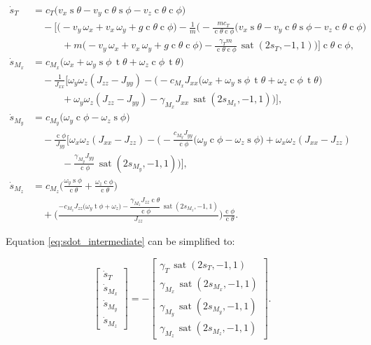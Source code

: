 \documentclass[conf]{new-aiaa}
\DeclareMathOperator{\s}{s}
\DeclareMathOperator{\cs}{c}
\DeclareMathOperator{\tn}{t}
\DeclareMathOperator{\sat}{sat}
\begin{document}
\small
\begingroup
\setlength{\jot}{1pt}
\begin{equation}
\label{eq:sdot_intermediate}
\begin{aligned}
\dot s_T
&= c_T\!\bigl(
v_x \s\theta - v_y \cs\theta \s\phi - v_z \cs\theta \cs\phi
\bigr) \\
&\quad - \biggl[
\bigl(
-v_y \,\omega_x + v_x \,\omega_y + g \cs\theta \cs\phi
\bigr)
- \frac{1}{m} \biggl(
-\frac{m c_T}{\cs\theta \cs\phi} \bigl(
v_x \s\theta - v_y \cs\theta \s\phi - v_z \cs\theta \cs\phi
\bigr) \\
&\qquad\quad
+ m \bigl(
-v_y \,\omega_x + v_x \,\omega_y + g \cs\theta \cs\phi
\bigr)
- \frac{\gamma_T m}{\cs\theta \cs\phi}\,
\sat(2s_T,-1,1)
\biggr) \biggr] \cs\theta \cs\phi,
\\[0.35em]
\dot s_{M_x}
&= c_{M_x} \!\bigl(
\omega_x + \omega_y \s\phi \,\tn\theta + \omega_z \cs\phi \,\tn\theta
\bigr) \\
&\quad - \frac{1}{J_{xx}} \biggl[
\omega_y \omega_z (J_{zz} - J_{yy})
- \bigl(
-c_{M_x} J_{xx} \bigl(
\omega_x + \omega_y \s\phi \,\tn\theta + \omega_z \cs\phi \,\tn\theta
\bigr) \\
&\qquad\quad
 + \omega_y \omega_z (J_{zz} - J_{yy})
 - \gamma_{M_x} J_{xx}\, \sat(2s_{M_x},-1,1)
\bigr) \biggr],
\\[0.35em]
\dot s_{M_y}
&= c_{M_y} \!\bigl(
\omega_y \cs\phi - \omega_z \s\phi
\bigr) \\
&\quad - \frac{\cs\phi}{J_{yy}} \biggl[
\omega_x \omega_z (J_{xx} - J_{zz})
- \biggl(
-\frac{c_{M_y} J_{yy}}{\cs\phi} \bigl(
\omega_y \cs\phi - \omega_z \s\phi
\bigr)
 + \omega_x \omega_z (J_{xx} - J_{zz}) \\
&\qquad\quad
 - \frac{\gamma_{M_y} J_{yy}}{\cs\phi}\,
\sat(2s_{M_y},-1,1)
\biggr) \biggr],
\\[0.35em]
\dot s_{M_z}
&= c_{M_z} \!\biggl(
\frac{\omega_y \s\phi}{\cs\theta} + \frac{\omega_z \cs\phi}{\cs\theta}
\biggr) \\
&\quad + \biggl(
\frac{
-c_{M_z} J_{zz} \bigl( \omega_y \tn\phi + \omega_z \bigr)
 - \dfrac{\gamma_{M_z} J_{zz} \cs\theta}{\cs\phi}\,
\sat(2s_{M_z},-1,1)
}{J_{zz}}
\biggr) \frac{\cs\phi}{\cs\theta}.
\end{aligned}
\end{equation}
\endgroup
\normalsize

Equation \ref{eq:sdot_intermediate} can be simplified to:

\small
\begin{equation}
\label{eq:sdot_final}
\begin{bmatrix}
\dot s_T \\ \dot s_{M_x} \\ \dot s_{M_y} \\ \dot s_{M_z}
\end{bmatrix}
=
-\begin{bmatrix}
\gamma_T\, \sat(2s_T,-1,1) \\
\gamma_{M_x}\, \sat(2s_{M_x},-1,1) \\
\gamma_{M_y}\, \sat(2s_{M_y},-1,1) \\
\gamma_{M_z}\, \sat(2s_{M_z},-1,1)
\end{bmatrix}.
\end{equation}
\normalsize
\end{document}
